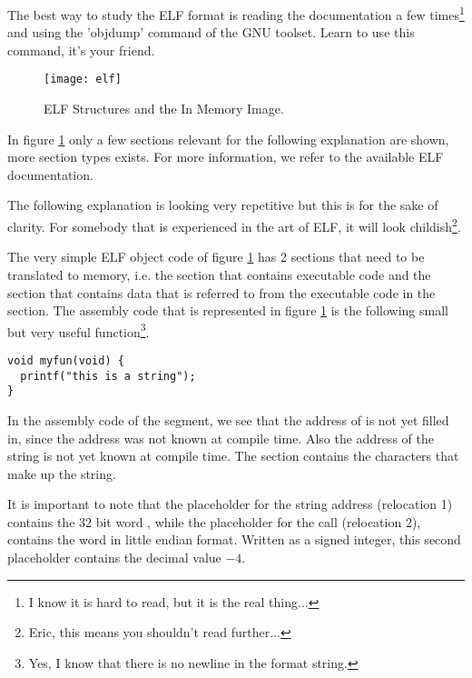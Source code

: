 The best way to study the ELF format is reading the documentation a few
times\footnote{I know it is hard to read, but it is the real thing...} and
using the 'objdump' command of the GNU toolset. Learn to use this command,
it's your friend.

\begin{figure}[!ht]
  \begin{center}
    \texttt{[image: elf]}
    \caption{ELF Structures and the In Memory Image.\label{fig:elf}}
 \end{center}
\end{figure}

In figure \ref{fig:elf} only a few sections relevant for the following
explanation are shown, more section types exists. For more information, we
refer to the available ELF documentation. 

The following explanation is looking very repetitive but this is for the
sake of clarity. For somebody that is experienced in the art of ELF, it
will look childish\footnote{Eric, this means you shouldn't read further...}.

The very simple ELF object code of figure \ref{fig:elf} has 2 sections that
need to be translated to memory, i.e. the  section that
contains executable code and the  section that contains data
that is referred to from the executable code in the  section. The
assembly code that is represented in figure \ref{fig:elf} is the following small
but very useful function\footnote{Yes, I know that there is no newline in
the format string.}.

\bcode
\begin{verbatim}
void myfun(void) {
  printf("this is a string");
}
\end{verbatim}
\ecode

In the assembly code of the  segment, we see that the address
of  is not yet filled in, since the address was not known
at compile time. Also the address of the string 
is not yet known at compile time. The  section contains the
characters that make up the string.

It is important to note that the placeholder for the string address
(relocation 1) contains the 32 bit word , while the
placeholder for the  call (relocation 2), contains the word
 in little endian format. Written as a signed integer,
this second placeholder contains the decimal value $-4$. 

